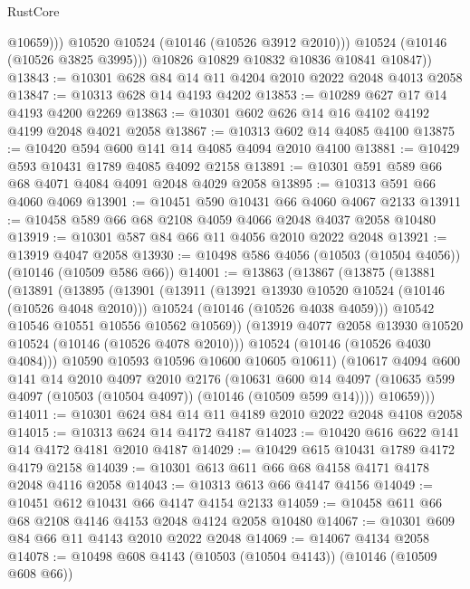\begin{lexlean}{RustCore}
\begin{coremodule}
                  @10659)))
            @10520
            @10524
            (@10146 (@10526 @3912 @2010)))
          @10524
          (@10146 (@10526 @3825 @3995)))
        @10826
        @10829
        @10832
        @10836
        @10841
        @10847))
@13843 := @10301 @628 @84 @14 @11 @4204 @2010 @2022 @2048 @4013 @2058
@13847 := @10313 @628 @14 @4193 @4202
@13853 := @10289 @627 @17 @14 @4193 @4200 @2269
@13863 := @10301 @602 @626 @14 @16 @4102 @4192 @4199 @2048 @4021 @2058
@13867 := @10313 @602 @14 @4085 @4100
@13875 := @10420 @594 @600 @141 @14 @4085 @4094 @2010 @4100
@13881 := @10429 @593 @10431 @1789 @4085 @4092 @2158
@13891 := @10301 @591 @589 @66 @68 @4071 @4084 @4091 @2048 @4029 @2058
@13895 := @10313 @591 @66 @4060 @4069
@13901 := @10451 @590 @10431 @66 @4060 @4067 @2133
@13911 := @10458 @589 @66 @68 @2108 @4059 @4066 @2048 @4037 @2058 @10480
@13919 := @10301 @587 @84 @66 @11 @4056 @2010 @2022 @2048
@13921 := @13919 @4047 @2058
@13930 := @10498 @586 @4056 (@10503 (@10504 @4056)) (@10146 (@10509 @586 @66))
@14001 := @13863
    (@13867
      (@13875
        (@13881
          (@13891
            (@13895
              (@13901
                (@13911
                  (@13921 @13930 @10520 @10524 (@10146 (@10526 @4048 @2010)))
                  @10524
                  (@10146 (@10526 @4038 @4059)))
                @10542
                @10546
                @10551
                @10556
                @10562
                @10569))
            (@13919 @4077 @2058 @13930 @10520 @10524 (@10146 (@10526 @4078 @2010)))
            @10524
            (@10146 (@10526 @4030 @4084)))
          @10590
          @10593
          @10596
          @10600
          @10605
          @10611)
        (@10617
          @4094
          @600
          @141
          @14
          @2010
          @4097
          @2010
          @2176
          (@10631
            @600
            @14
            @4097
            (@10635 @599 @4097 (@10503 (@10504 @4097)) (@10146 (@10509 @599 @14))))
          @10659)))
@14011 := @10301 @624 @84 @14 @11 @4189 @2010 @2022 @2048 @4108 @2058
@14015 := @10313 @624 @14 @4172 @4187
@14023 := @10420 @616 @622 @141 @14 @4172 @4181 @2010 @4187
@14029 := @10429 @615 @10431 @1789 @4172 @4179 @2158
@14039 := @10301 @613 @611 @66 @68 @4158 @4171 @4178 @2048 @4116 @2058
@14043 := @10313 @613 @66 @4147 @4156
@14049 := @10451 @612 @10431 @66 @4147 @4154 @2133
@14059 := @10458 @611 @66 @68 @2108 @4146 @4153 @2048 @4124 @2058 @10480
@14067 := @10301 @609 @84 @66 @11 @4143 @2010 @2022 @2048
@14069 := @14067 @4134 @2058
@14078 := @10498 @608 @4143 (@10503 (@10504 @4143)) (@10146 (@10509 @608 @66))

\end{coremodule}
\end{lexlean}
